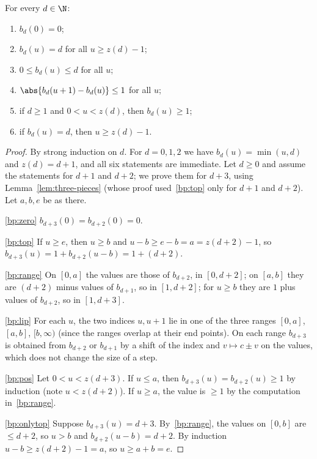 
\begin{lemma}\label{lem:bingF-props}
For every $d\in\N$:
\begin{enumerate}[label=(\alph*)]
\item\label{bp:zero} $b_d(0)=0$;
\item\label{bp:top} $b_d(u)=d$ for all $u\ge z(d)-1$;
\item\label{bp:range} $0\le b_d(u)\le d$ for all $u$;
\item\label{bp:lip} $\abs{b_d(u+1)-b_d(u)}\le1$ for all $u$;
\item\label{bp:pos} if $d\ge1$ and $0<u<z(d)$, then $b_d(u)\ge1$;
\item\label{bp:onlytop} if $b_d(u)=d$, then $u\ge z(d)-1$.
\end{enumerate}
\end{lemma}

\begin{proof}
By strong induction on $d$. For $d=0,1,2$ we have $b_d(u)=\min(u,d)$ and $z(d)=d+1$, and all six
statements are immediate. Let $d\ge0$ and assume the statements for $d+1$ and $d+2$; we prove
them for $d+3$, using Lemma~\ref{lem:three-pieces} (whose proof used~\ref{bp:top} only for $d+1$
and $d+2$). Let $a,b,e$ be as there.

\ref{bp:zero} $b_{d+3}(0)=b_{d+2}(0)=0$.

\ref{bp:top} If $u\ge e$, then $u\ge b$ and $u-b\ge e-b=a=z(d+2)-1$, so
$b_{d+3}(u)=1+b_{d+2}(u-b)=1+(d+2)$.

\ref{bp:range} On $[0,a]$ the values are those of $b_{d+2}$, in $[0,d+2]$; on $[a,b]$ they are
$(d+2)$ minus values of $b_{d+1}$, so in $[1,d+2]$; for $u\ge b$ they are $1$ plus values of
$b_{d+2}$, so in $[1,d+3]$.

\ref{bp:lip} For each $u$, the two indices $u,u+1$ lie in one of the three ranges $[0,a]$,
$[a,b]$, $[b,\infty)$ (since the ranges overlap at their end points). On each range $b_{d+3}$ is
obtained from $b_{d+2}$ or $b_{d+1}$ by a shift of the index and $v\mapsto c\pm v$ on the values,
which does not change the size of a step.

\ref{bp:pos} Let $0<u<z(d+3)$. If $u\le a$, then $b_{d+3}(u)=b_{d+2}(u)\ge1$ by induction (note
$u<z(d+2)$). If $u\ge a$, the value is $\ge1$ by the computation in~\ref{bp:range}.

\ref{bp:onlytop} Suppose $b_{d+3}(u)=d+3$. By~\ref{bp:range}, the values on $[0,b]$ are $\le d+2$,
so $u>b$ and $b_{d+2}(u-b)=d+2$. By induction $u-b\ge z(d+2)-1=a$, so $u\ge a+b=e$.
\end{proof}

